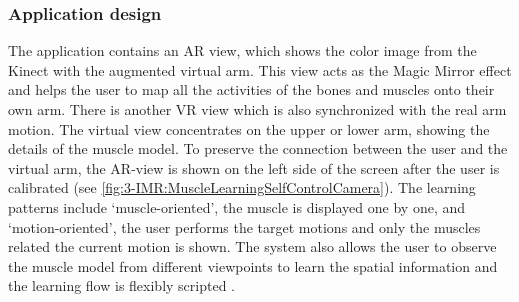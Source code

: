 \subsubsection{Application design}
The application contains an AR view, which shows the color image from the Kinect with the augmented virtual arm. This view acts as the Magic Mirror effect and helps the user to map all the activities of the bones and muscles onto their own arm. There is another VR view which is also synchronized with the real arm motion. The virtual view concentrates on the upper or lower arm, showing the details of the muscle model. To preserve the connection between the user and the virtual arm, the AR-view is shown on the left side of the screen after the user is calibrated (see \figurename{\ref{fig:3-IMR:MuscleLearningSelfControlCamera}}). 
The learning patterns include `muscle-oriented', the muscle is displayed one by one, and `motion-oriented', the user performs the target motions and only the muscles related the current motion is shown. 
The system also allows the user to observe the muscle model from different viewpoints to learn the spatial information and the learning flow is flexibly scripted \cite{Jutzi2015}. 

